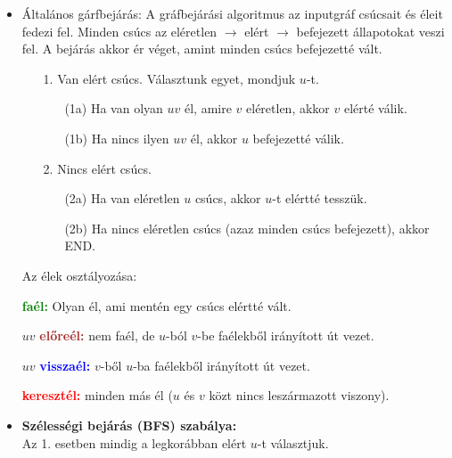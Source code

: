 \documentclass[../../szobeli.tex]{subfiles}
\begin{document}
\begin{center}
    \noindent{}
\end{center}
    \begin{itemize}
        \item Általános gárfbejárás: A gráfbejárási algoritmus az inputgráf csúcsait és éleit fedezi fel. Minden csúcs az eléretlen $\rightarrow$ elért $\rightarrow$ befejezett állapotokat veszi fel. A bejárás akkor ér véget, amint minden csúcs befejezetté vált. \begin{itemize}
            \item[1.] Van elért csúcs. Választunk egyet, mondjuk $u$-t. \begin{itemize}
                \item[(1a)] Ha van olyan $uv$ él, amire $v$ eléretlen, akkor $v$ elérté válik.
                \item[(1b)] Ha nincs ilyen $uv$ él, akkor $u$ befejezetté válik.
            \end{itemize}
            \item[2.] Nincs elért csúcs. \begin{itemize}
                \item[(2a)] Ha van eléretlen $u$ csúcs, akkor $u$-t elértté tesszük.
                \item[(2b)] Ha nincs eléretlen csúcs (azaz minden csúcs befejezett), akkor END.
            \end{itemize} 
        \end{itemize}

        Az élek osztályozása:

			\textbf{\textcolor{green}{faél:}} Olyan él, ami mentén egy csúcs elértté vált.

			$uv$ \textbf{\textcolor{brown}{előreél:}} nem faél, de $u$-ból $v$-be faélekből irányított út vezet.

			$uv$ \textbf{\textcolor{blue}{visszaél:}} $v$-ből $u$-ba faélekből irányított út vezet.

			\textbf{\textcolor{red}{keresztél:}} minden más él ($u$ és $v$ közt nincs leszármazott viszony).

        \item \textbf{Szélességi bejárás (BFS) szabálya:} \\Az 1. esetben mindig a legkorábban elért $u$-t választjuk.


\end{itemize}
\end{document}
